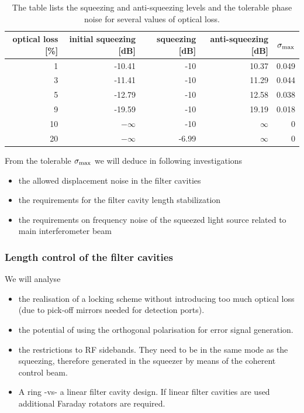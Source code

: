 \begin{table}[h]
\begin{center}
\begin{tabular}{rrrrr}
\hline
\hline
optical loss [\%]& initial squeezing [dB] & squeezing [dB] & anti-squeezing [dB] & $\sigma_{\rm max}$ \\
\hline
1 & -10.41 & -10 & 10.37 & 0.049\\
3 & -11.41 & -10 & 11.29 & 0.044\\
5 & -12.79 & -10 & 12.58 & 0.038\\
9 & -19.59 & -10 & 19.19& 0.018 \\
10 & $-\infty$ & -10 & $\infty$ & 0\\
20 & $-\infty$ & -6.99 & $\infty$ & 0\\
\hline
\hline
\end{tabular}
\end{center}
\caption{The table lists  the squeezing and anti-squeezing levels and the tolerable phase noise for several values of optical loss.}
\label{tab:phsnoiselimit}
\end{table}

From the tolerable $\sigma_{\rm max}$ we will deduce in following investigations
\begin{itemize}
\item{the allowed displacement noise in the  filter cavities}
\item{the requirements for the filter cavity length stabilization}
\item{the requirements on frequency noise of the squeezed light source related to main interferometer beam}
\end{itemize}
\FloatBarrier
\subsubsection{Length control of the filter cavities}
We will analyse
\begin{itemize}
\item{the realisation of a locking scheme without introducing too much optical loss (due to pick-off mirrors needed for detection ports). }
\item{the potential of using the orthogonal polarisation for error signal generation.}
\item{the restrictions to RF sidebands. They need to be in the same mode as the squeezing, therefore generated in the squeezer by means of the coherent control beam.}
\item{A ring -vs- a linear filter cavity design. If linear filter cavities are used additional Faraday rotators are required.}
\end{itemize}

